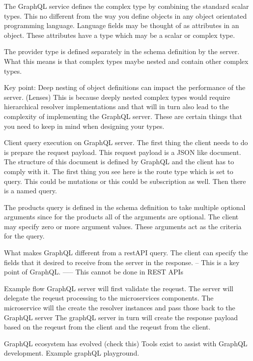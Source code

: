 The GraphQL service defines the complex type by combining the standard scalar types.
This no different from the way you define objects in any object orientated programming language.
Language fields may be thought of as attributes in an object.
These attributes have a type which may be a scalar or complex type.


The provider type is defined separately in the schema definition by the server.
What this means is that complex types maybe nested and contain other complex types.

Key point: Deep nesting of object definitions can impact the performance of the server. (Lenses)
This is because deeply nested complex types would require hierarchical resolver implementations and that will in turn also lead to the complexity of implementing the GraphQL server.
These are certain things that you need to keep in mind when designing your types.

Client query execution on GraphQL server.
The first thing the client needs to do is prepare the request payload.
This request payload is a JSON like document.
The structure of this document is defined by GraphQL and the client has to comply with it.
The first thing you see here is the route type which is set to query.
This could be mutations or this could be subscription as well.
Then there is a named query.

The products query is defined in the schema definition to take multiple optional arguments since for the products all of the arguments are optional.
The client may specify zero or more argument values.
These arguments act as the criteria for the query.

What makes GraphQL different from a restAPI query.
The client can specify the fields that it desired to receive from the server in the response.
-- This is a key point of GraphQL.
----- This cannot be done in REST APIs

Example flow
GraphQL server will first validate the reqeust.
The server will delegate the reqeust processing to the microservices components.
The microservice will the create the resolver instances and pass those back to the GraphQL server
The graphQL server in turn will create the response payload based on the reqeust from the client and the reqeust from the client.

GraphQL ecosystem has evolved (check this)
Tools exist to assist with GraphQL development.
Example graphQL playground.

